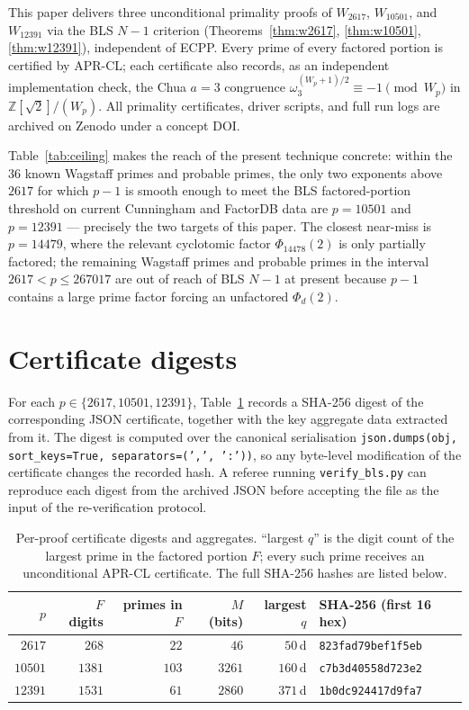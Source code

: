 \documentclass[11pt,a4paper]{amsart}
\theoremstyle{plain}
\theoremstyle{definition}
\newcommand{\Z}{\mathbb{Z}}
\newcommand{\wom}{\omega_3}
\newcommand{\sqrttwo}{\sqrt{2}}
\begin{document}
This paper delivers three unconditional primality proofs of
$W_{2617}$, $W_{10501}$, and $W_{12391}$ via the BLS $N - 1$
criterion (Theorems~\ref{thm:w2617}, \ref{thm:w10501},
\ref{thm:w12391}), independent of ECPP. Every prime of every factored
portion is certified by APR-CL; each certificate also records, as an
independent implementation check, the Chua $a = 3$ congruence
$\wom^{(W_p + 1)/2} \equiv -1 \pmod{W_p}$ in
$\Z[\sqrttwo]/(W_p)$. All primality certificates, driver scripts, and
full run logs are archived on Zenodo under a concept DOI.

Table~\ref{tab:ceiling} makes the reach of the present technique
concrete: within the $36$ known Wagstaff primes and probable primes,
the only two exponents above $2617$ for which $p - 1$ is smooth
enough to meet the BLS factored-portion threshold on current
Cunningham and FactorDB data are $p = 10501$ and $p = 12391$ ---
precisely the two targets of this paper. The closest near-miss is
$p = 14479$, where the relevant cyclotomic factor $\Phi_{14478}(2)$
is only partially factored; the remaining Wagstaff primes and
probable primes in the interval $2617 < p \leq 267017$ are out of
reach of BLS $N - 1$ at present because $p - 1$ contains a large
prime factor forcing an unfactored $\Phi_d(2)$.

\appendix

\section{Certificate digests}
\label{sec:digests}

For each $p \in \{2617, 10501, 12391\}$, Table~\ref{tab:digests}
records a SHA-256 digest of the corresponding JSON certificate,
together with the key aggregate data extracted from it. The digest
is computed over the canonical serialisation
\texttt{json.dumps(obj, sort\_keys=True, separators=(',', ':'))}, so
any byte-level modification of the certificate changes the recorded
hash. A referee running \texttt{verify\_bls.py} can reproduce each
digest from the archived JSON before accepting the file as the
input of the re-verification protocol.

\begin{table}[h]
\centering
\small
\begin{tabular}{rrrrrl}
\toprule
$p$ & $F$ digits & primes in $F$ & $M$ (bits) & largest $q$ & SHA-256 (first 16 hex) \\
\midrule
$ 2617$ &  $268$ &  $22$ &   $46$ & $ 50$\,d & \texttt{823fad79bef1f5eb} \\
$10501$ & $1381$ & $103$ & $3261$ & $160$\,d & \texttt{c7b3d40558d723e2} \\
$12391$ & $1531$ & $ 61$ & $2860$ & $371$\,d & \texttt{1b0dc924417d9fa7} \\
\bottomrule
\end{tabular}
\caption{Per-proof certificate digests and aggregates. ``largest $q$''
is the digit count of the largest prime in the factored portion $F$;
every such prime receives an unconditional APR-CL certificate.
The full SHA-256 hashes are listed below.}
\label{tab:digests}
\end{table}
\end{document}
